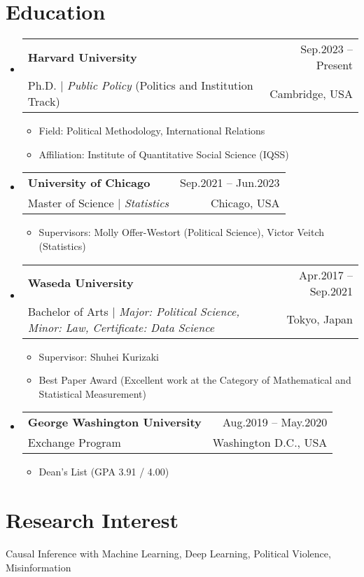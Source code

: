 \documentclass[letterpaper,11pt]{article} %
\makeatletter
\newcommand{\CVItem}[1]{
  \item\small{
    {#1 \vspace{-2pt}}
  }
}
\newcommand{\CVSubheading}[4]{
  \vspace{-2pt}\item
    \begin{tabular*}{0.97\textwidth}[t]{l@{\extracolsep{\fill}}r}
      \textbf{#1} & #2 \\
      \small#3 & \small #4 \\
    \end{tabular*}\vspace{-7pt}
}
\newcommand{\CVSubHeadingListStart}{\begin{itemize}[leftmargin=0.5cm, label={}]}
\newcommand{\CVSubHeadingListEnd}{\end{itemize}}
\newcommand{\CVItemListStart}{\begin{itemize}}
\newcommand{\CVItemListEnd}{\end{itemize}\vspace{-5pt}}
\makeatother
\begin{document}
\section{Education}
  \CVSubHeadingListStart
    \CVSubheading %
     {{Harvard University}}{Sep.2023 -- Present}
      {Ph.D. $|$ \emph{Public Policy} (Politics and Institution Track)}{Cambridge, USA}
      \CVItemListStart
        \CVItem{Field: Political Methodology, International Relations}
        \CVItem{Affiliation: Institute of Quantitative Social Science (IQSS)}
       \CVItemListEnd
    \CVSubheading
      {{University of Chicago}}{Sep.2021 -- Jun.2023}
      {Master of Science $|$ \emph{Statistics}}{Chicago, USA}
       \CVItemListStart
        \CVItem{Supervisors: Molly Offer-Westort (Political Science), Victor Veitch (Statistics)}

    \CVItemListEnd
    \CVSubheading
      {{Waseda University}}{Apr.2017 -- Sep.2021}
      {Bachelor of Arts $|$ \emph{\small{Major: Political Science, Minor: Law,  Certificate: Data Science}}}{Tokyo, Japan}
      \CVItemListStart
        \CVItem{Supervisor: Shuhei Kurizaki}
        \CVItem{Best Paper Award (Excellent work at the Category of Mathematical and Statistical Measurement)}
    \CVItemListEnd
    \CVSubheading
      {George Washington University}{Aug.2019 -- May.2020}
      {Exchange Program}{Washington D.C., USA}
      \CVItemListStart
        \CVItem{Dean's List (GPA 3.91 / 4.00)} %
    \CVItemListEnd
  \CVSubHeadingListEnd

\section{Research Interest}
Causal Inference with Machine Learning, Deep Learning, Political Violence, Misinformation
\end{document}
